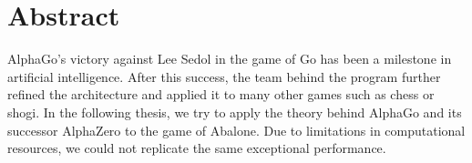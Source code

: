 \chapter*{Abstract}

AlphaGo's victory against Lee Sedol in the game of Go has been a milestone in artificial intelligence. After this success, the team behind the program further refined the architecture and applied it to many other games such as chess or shogi. In the following thesis, we try to apply the theory behind AlphaGo and its successor AlphaZero to the game of Abalone. Due to limitations in computational resources, we could not replicate the same exceptional performance.